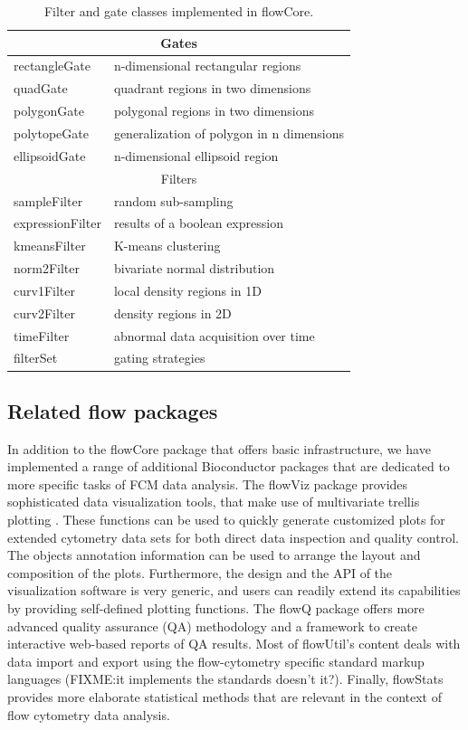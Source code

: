 \documentclass[12pt]{article}
\begin{document}
\begin{table}[ht]
\begin{center}
\begin{tabular}{|l|l|}
\hline
\multicolumn{2}{|c|}{Gates} \\
\hline
rectangleGate & n-dimensional rectangular regions \\
quadGate & quadrant regions in two dimensions \\
polygonGate & polygonal regions in two dimensions \\
polytopeGate & generalization of polygon in n dimensions \\
ellipsoidGate & n-dimensional ellipsoid region \\
\hline
\multicolumn{2}{|c|}{Filters} \\
\hline
sampleFilter & random sub-sampling\\
expressionFilter & results of a boolean expression \\
kmeansFilter & K-means clustering \\
norm2Filter & bivariate normal distribution \\
curv1Filter & local density regions in 1D \\
curv2Filter & density regions in 2D \\
timeFilter & abnormal data acquisition over time \\
\hline
filterSet & gating strategies \\
\hline
\end{tabular}
\caption{\label{table2}Filter and gate classes implemented in flowCore.}
\end{center}
\end{table}

\subsection*{Related flow packages}

In addition to the flowCore package that offers basic infrastructure,
we have implemented a range of additional Bioconductor packages that
are dedicated to more specific tasks of FCM data analysis. The flowViz
package \citep{sarkar2008ufv} provides sophisticated data
visualization tools, that make use of multivariate trellis plotting
\citep{FIXME:citeDeepayansBook}.  These functions can be used to
quickly generate customized plots for extended cytometry data sets for
both direct data inspection and quality control.  The objects
annotation information can be used to arrange the layout and
composition of the plots.  Furthermore, the design and the API of the
visualization software is very generic, and users can readily extend
its capabilities by providing self-defined plotting functions.  The
flowQ package offers more advanced quality assurance (QA) methodology
and a framework to create interactive web-based reports of QA results.
Most of flowUtil's content deals with data import and export using the
flow-cytometry specific standard markup languages (FIXME:it implements
the standards doesn't it?).  Finally, flowStats provides more
elaborate statistical methods that are relevant in the context of flow
cytometry data analysis.
\end{document}
